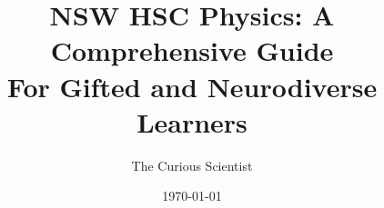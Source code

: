 \documentclass[justified,notoc]{tufte-book}
\title{NSW HSC Physics: A Comprehensive Guide\\
\large For Gifted and Neurodiverse Learners}
\author{The Curious Scientist}
\date{\today}
\begin{document}
\maketitle

\tableofcontents


\FloatBarrier


% 

% 

% 

% 

% 

% 

% 

% 
\end{document}

